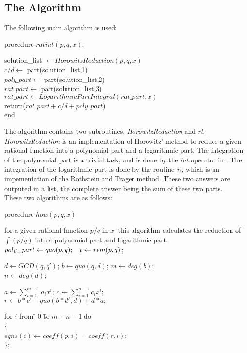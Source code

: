 \subsection{The Algorithm}
The following main algorithm is used:

procedure $ratint(p,q,x);$


    solution\_list $\leftarrow HorowitzReduction(p,q,x)$ 
 \\
    $c/d \leftarrow$ part(solution\_list,1)\\  
    $poly\_part \leftarrow$ part(solution\_list,2)
  \\
    $rat\_part \leftarrow$ part(solution\_list,3)
\\
    $rat\_part \leftarrow LogarithmicPartIntegral(rat\_part,x) $
\\
 return($rat\_part+c/d +poly\_part$)
\\
end

The algorithm contains two subroutines, \emph{HorowitzReduction} and \emph{rt}. \emph{HorowitzReduction} is an implementation of Horowitz' method to reduce a given rational function into a polynomial part and a logarithmic part. The integration of the polynomial part is a trivial task, and is done by the \emph{int} operator in \REDUCE. The integration of the logarithmic part is done by the routine \emph{rt}, which is an impementation of the Rothstein and Trager method. These two answers are outputed in a list, the complete answer being the sum of these two parts.
\\
These two algorithms are as follows:

procedure $how(p,q,x)$

for a given rational function $p/q$ in $x$, this algorithm calculates the
reduction of $ \int(p/q)$ into a polynomial part and logarithmic part. \\[\baselineskip]
$ poly\_part \leftarrow quo(p,q); \hspace{3 mm}  p \leftarrow rem(p,q)$;

$d \leftarrow GCD(q,q') $; \hspace{3 mm}    $b \leftarrow quo(q,d)$; \hspace{3 mm}
$m \leftarrow deg(b)$; \\  $n \leftarrow deg(d)$;

$a \leftarrow  \sum_{i=1}^{m-1} a_{i}x^{i}$; \hspace{3 mm}
   $ c \leftarrow \sum_{i=1}^{n-1} c_{i}x^{i}$; \\[\baselineskip]
%
$r \leftarrow b*c'-quo(b*d',d)+d*a; $
\vspace*{\baselineskip}
\begin{tabbing}
for $i$ from \= $0$ \=  to $m+n-1$ do \\
\> \{ \\
\> \>   $  eqns(i) \leftarrow coeff(p,i)=coeff(r,i)$; \\
\> \};
\end{tabbing}

